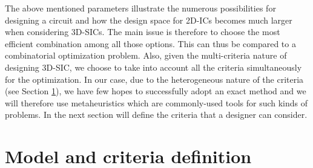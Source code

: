 The above mentioned parameters illustrate the numerous possibilities for designing a circuit and how the design space for 2D-ICs becomes much larger when considering 3D-SICs. The main issue is therefore to choose the most efficient combination among all those options. This can thus be compared to a combinatorial optimization problem. Also, given the multi-criteria nature of designing 3D-SIC, we choose to take into account all the criteria simultaneously for the optimization. In our case, due to the heterogeneous nature of the criteria (see Section \ref{sec:crit}), we have few hopes to successfully adopt an exact method and we will therefore use metaheuristics which are commonly-used tools for such kinds of problems. In the next section will define the criteria that a designer can consider.

\section{Model and criteria definition}
\label{sec:crit}

